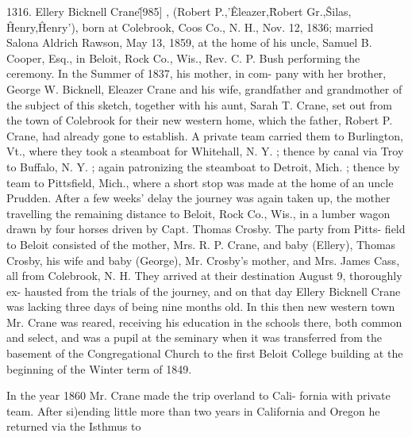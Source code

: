 \documentclass{book}
\begin{document}
1316. Ellery Bicknell Crane\^ [985] , (Robert P.,'\^ Eleazer,\^ 
Robert Gr.,\^ Silas, \^ Henry,\^ Henry'), born at Colebrook, Coos 
Co., N. H., Nov. 12, 1836; married Salona Aldrich Rawson, 
May 13, 1859, at the home of his uncle, Samuel B. Cooper, 
Esq., in Beloit, Rock Co., Wis., Rev. C. P. Bush performing 
the ceremony. In the Summer of 1837, his mother, in com- 
pany with her brother, George W. Bicknell, Eleazer Crane and 
his wife, grandfather and grandmother of the subject of this 
sketch, together with his aunt, Sarah T. Crane, set out from the 
town of Colebrook for their new western home, which the father, 
Robert P. Crane, had already gone to establish. A private team 
carried them to Burlington, Vt., where they took a steamboat for 
Whitehall, N. Y. ; thence by canal via Troy to Buffalo, N. Y. ; 
again patronizing the steamboat to Detroit, Mich. ; thence by 
team to Pittsfield, Mich., where a short stop was made at the 
home of an uncle Prudden. After a few weeks' delay the journey 
was again taken up, the mother travelling the remaining distance 
to Beloit, Rock Co., Wis., in a lumber wagon drawn by four 
horses driven by Capt. Thomas Crosby. The party from Pitts- 
field to Beloit consisted of the mother, Mrs. R. P. Crane, and 
baby (Ellery), Thomas Crosby, his wife and baby (George), Mr. 
Crosby's mother, and Mrs. James Cass, all from Colebrook, N. 
H. They arrived at their destination August 9, thoroughly ex- 
hausted from the trials of the journey, and on that day Ellery 
Bicknell Crane was lacking three days of being nine months old. 
In this then new western town Mr. Crane was reared, receiving 
his education in the schools there, both common and select, and 
was a pupil at the seminary when it was transferred from the 
basement of the Congregational Church to the first Beloit College 
building at the beginning of the Winter term of 1849. 

In the year 1860 Mr. Crane made the trip overland to Cali- 
fornia with private team. After si)ending little more than two 
years in California and Oregon he returned via the Isthmus to 
\end{document}
